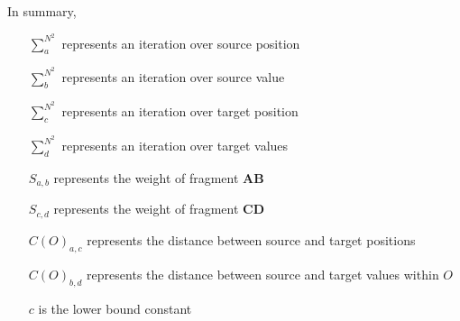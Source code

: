 In summary,
\begin{itemize}
    \item [$\sum_{a}^{N^2}$] represents an iteration over source position
    \item [$\sum_{b}^{N^2}$] represents an iteration over source value
    \item [$\sum_{c}^{N^2}$] represents an iteration over target position
    \item [$\sum_{d}^{N^2}$] represents an iteration over target values
    \item [$S_{a,b}$] represents the weight of fragment $\bm{AB}$
    \item [$S_{c,d}$] represents the weight of fragment $\bm{CD}$
    \item [$C(O)_{a,c}$] represents the distance between source and target positions
    \item [$C(O)_{b,d}$] represents the distance between source and target values within $O$
    \item [$c$] is the lower bound constant
\end{itemize}
